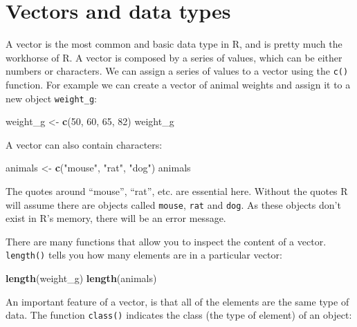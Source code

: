\documentclass[]{book}
\newenvironment{Shaded}{\begin{snugshade}}{\end{snugshade}}
\newcommand{\KeywordTok}[1]{\textcolor[rgb]{0.13,0.29,0.53}{\textbf{{#1}}}}
\newcommand{\DecValTok}[1]{\textcolor[rgb]{0.00,0.00,0.81}{{#1}}}
\newcommand{\StringTok}[1]{\textcolor[rgb]{0.31,0.60,0.02}{{#1}}}
\newcommand{\NormalTok}[1]{{#1}}
\theoremstyle{definition}
\theoremstyle{definition}
\theoremstyle{remark}
\begin{document}
\section{Vectors and data types}\label{vectors-and-data-types}

A vector is the most common and basic data type in R, and is pretty much
the workhorse of R. A vector is composed by a series of values, which
can be either numbers or characters. We can assign a series of values to
a vector using the \texttt{c()} function. For example we can create a
vector of animal weights and assign it to a new object
\texttt{weight\_g}:

\begin{Shaded}
\begin{Highlighting}[]
\NormalTok{weight_g <-}\StringTok{ }\KeywordTok{c}\NormalTok{(}\DecValTok{50}\NormalTok{, }\DecValTok{60}\NormalTok{, }\DecValTok{65}\NormalTok{, }\DecValTok{82}\NormalTok{)}
\NormalTok{weight_g}
\end{Highlighting}
\end{Shaded}

A vector can also contain characters:

\begin{Shaded}
\begin{Highlighting}[]
\NormalTok{animals <-}\StringTok{ }\KeywordTok{c}\NormalTok{(}\StringTok{"mouse"}\NormalTok{, }\StringTok{"rat"}\NormalTok{, }\StringTok{"dog"}\NormalTok{)}
\NormalTok{animals}
\end{Highlighting}
\end{Shaded}

The quotes around ``mouse'', ``rat'', etc. are essential here. Without
the quotes R will assume there are objects called \texttt{mouse},
\texttt{rat} and \texttt{dog}. As these objects don't exist in R's
memory, there will be an error message.

There are many functions that allow you to inspect the content of a
vector. \texttt{length()} tells you how many elements are in a
particular vector:

\begin{Shaded}
\begin{Highlighting}[]
\KeywordTok{length}\NormalTok{(weight_g)}
\KeywordTok{length}\NormalTok{(animals)}
\end{Highlighting}
\end{Shaded}

An important feature of a vector, is that all of the elements are the
same type of data. The function \texttt{class()} indicates the class
(the type of element) of an object:
\end{document}
